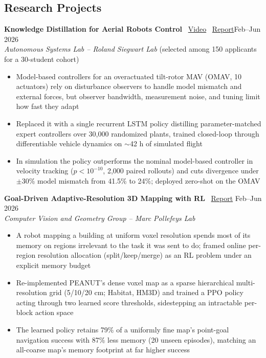\documentclass[a4paper,10pt]{article}
\begin{document}
\subsection*{Research Projects}
\textbf{Knowledge Distillation for Aerial Robots Control} \faVideo\ \href{https://www.youtube.com/watch?v=oPd9mkxEaO8}{Video} \faFilePdf\ \href{https://alessiosalvatore1703-ops.github.io/assets/projects/aerial-knowledge-distillation/ReportPLR_Salvatore_Stefanini.pdf}{Report}\hfill Feb--Jun 2026\\
\textit{Autonomous Systems Lab -- Roland Siegwart Lab} (selected among 150 applicants for a 30-student cohort)
\begin{itemize}
    \vspace{-5pt}
    \item Model-based controllers for an overactuated tilt-rotor MAV (OMAV, 10 actuators) rely on disturbance observers to handle model mismatch and external forces, but observer bandwidth, measurement noise, and tuning limit how fast they adapt
    \item Replaced it with a single recurrent LSTM policy distilling parameter-matched expert controllers over 30,000 randomized plants, trained closed-loop through differentiable vehicle dynamics on $\sim$42 h of simulated flight
    \item In simulation the policy outperforms the nominal model-based controller in velocity tracking ($p < 10^{-10}$, 2,000 paired rollouts) and cuts divergence under $\pm$30\% model mismatch from 41.5\% to 24\%; deployed zero-shot on the OMAV
\end{itemize}
\textbf{Goal-Driven Adaptive-Resolution 3D Mapping with RL} \faFilePdf\ \href{https://alessiosalvatore1703-ops.github.io/assets/projects/task-aware-3d-mapping/3dv_final_report.pdf}{Report}
\hfill Feb--Jun 2026\\
\textit{Computer Vision and Geometry Group -- Marc Pollefeys Lab}
\begin{itemize}
    \vspace{-5pt}
    \item A robot mapping a building at uniform voxel resolution spends most of its memory on regions irrelevant to the task it was sent to do; framed online per-region resolution allocation (split/keep/merge) as an RL problem under an explicit memory budget
    \item Re-implemented PEANUT's dense voxel map as a sparse hierarchical multi-resolution grid (5/10/20 cm; Habitat, HM3D) and trained a PPO policy acting through two learned score thresholds, sidestepping an intractable per-block action space
    \item The learned policy retains 79\% of a uniformly fine map's point-goal navigation success with 87\% less memory (20 unseen episodes), matching an all-coarse map's memory footprint at far higher success
\end{itemize}
\end{document}
